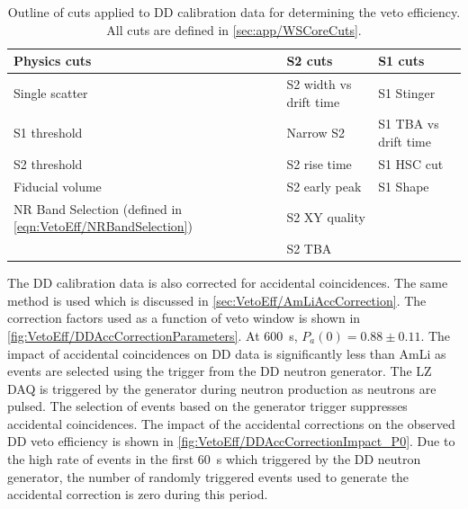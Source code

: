 \begin{table}[!ht]
	\centering
	\caption{Outline of cuts applied to DD calibration data for determining the veto efficiency. All cuts are defined in \autoref{sec:app/WSCoreCuts}.}
	\begin{tabular}{lll}
    \hline\hline
	\textbf{Physics cuts}&\textbf{S2 cuts}&\textbf{S1 cuts} \\
	\hline
	Single scatter & S2 width vs drift time & S1 Stinger \\
	S1 threshold & Narrow S2 & S1 TBA vs drift time  \\
	S2 threshold & S2 rise time & S1 HSC cut \\
    Fiducial volume & S2 early peak & S1 Shape \\
	NR Band Selection (defined in \autoref{eqn:VetoEff/NRBandSelection})& S2 XY quality & \\
	& S2 TBA & \\
    \hline\hline
	\end{tabular}
	\label{tab:VetoEff/dd_efficiency_cuts}
\end{table}
The DD calibration data is also corrected for accidental coincidences. The same method is used which is discussed in \autoref{sec:VetoEff/AmLiAccCorrection}. The correction factors used as a function of veto window is shown in \autoref{fig:VetoEff/DDAccCorrectionParameters}. At 600~\textmu s, $P_a(0)=0.88\pm0.11$. The impact of accidental coincidences on DD data is significantly less than AmLi as events are selected using the trigger from the DD neutron generator. The LZ DAQ is triggered by the generator during neutron production as neutrons are pulsed. The selection of events based on the generator trigger suppresses accidental coincidences. The impact of the accidental corrections on the observed DD veto efficiency is shown in \autoref{fig:VetoEff/DDAccCorrectionImpact_P0}. Due to the high rate of events in the first 60~\textmu s which triggered by the DD neutron generator, the number of randomly triggered events used to generate the accidental correction is zero during this period.

